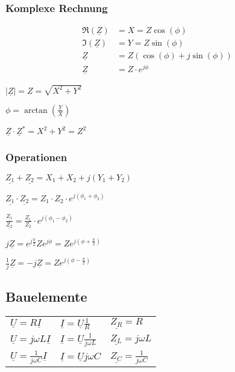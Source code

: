 \documentclass[10pt,a4paper]{scrartcl}
\begin{document}
\begin{multicols*}{3}
	
	 	
	
	\subsubsection{Komplexe Rechnung}

	\begin{align*}
	\Re(\underline{Z})&=X=Z\cos(\phi)\\
	\Im(\underline{Z})&=Y=Z\sin(\phi)\\
	\underline{Z}&=Z(\cos(\phi)+j\sin(\phi))\\
	\underline{Z}&=Z\cdot e^{j\phi}
	\end{align*}
	
	$|\underline{Z}|=Z=\sqrt{X^2+Y^2}$
	
	$\phi=\arctan(\frac{Y}{X})$
	
	$\underline{Z}\cdot\underline{Z}^*=X^2+Y^2=Z^2$
	
	\vfill
	\null
	\columnbreak
	
	\subsubsection{Operationen}
	
	$\underline{Z_1}+\underline{Z_2}=X_1+X_2+j(Y_1+Y_2)$
	
	$\underline{Z_1}\cdot\underline{Z_2}=Z_1\cdot Z_2\cdot e^{j(\phi_1+\phi_2)}$
	
	$\frac{\underline{Z_1}}{\underline{Z_2}}=\frac{Z_1}{Z_2}\cdot e^{j(\phi_1-\phi_2)}$
	
	$j\underline{Z}=e^{j\frac{\pi}{2}}Ze^{j\phi}=Ze^{j(\phi+\frac{\pi}{2})}$
	
	$\frac{1}{j}\underline{Z}=-j\underline{Z}=Ze^{j(\phi-\frac{\pi}{2})}$
	
	 
	
	\subsection{Bauelemente}
	
	\small
	\begin{tabular}{lll}
	$\underline{U}=R\underline{I}$&$\underline{I}=\underline{U}\frac{1}{R}$&$\underline{Z_R}=R$\\
	$\underline{U}=j\omega L \underline{I}$&$\underline{I}=\underline{U}\frac{1}{j\omega L}$&$\underline{Z_L}=j\omega L$\\
	$\underline{U}=\frac{1}{j\omega C}\underline{I}$&$\underline{I}=\underline{U}j\omega C$&$\underline{Z_C}=\frac{1}{j\omega C}$
	\end{tabular}	
	\normalsize
	

\end{multicols*}
\end{document}
